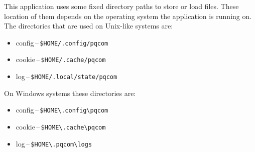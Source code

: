 This application uses some fixed directory paths to store or load files. These location of them depends on the operating system the application is running on. The directories that are used on Unix-like systems are:
\begin{itemize}
  \item config\,--\,\texttt{\$HOME/.config/pqcom}
  \item cookie\,--\,\texttt{\$HOME/.cache/pqcom}
  \item log\,--\,\texttt{\$HOME/.local/state/pqcom}
\end{itemize}
\noindent On Windows systems these directories are:
\begin{itemize}
  \item config\,--\,\texttt{\$HOME\textbackslash .config\textbackslash pqcom}
  \item cookie\,--\,\texttt{\$HOME\textbackslash .cache\textbackslash pqcom}
  \item log\,--\,\texttt{\$HOME\textbackslash.pqcom\textbackslash logs}
\end{itemize}
